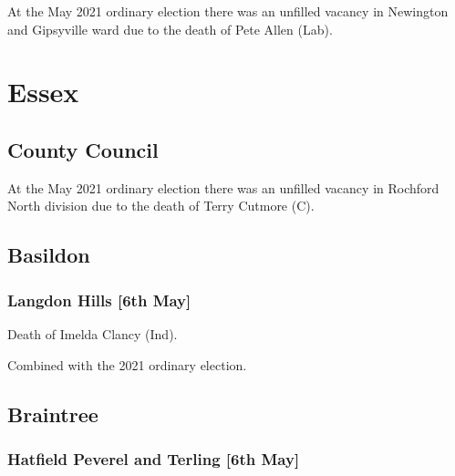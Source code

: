 \documentclass[a4paper,openany]{book}
\begin{document}
\begin{resultsiii}
At the May 2021 ordinary election there was an unfilled vacancy in Newington and Gipsyville ward due to the death of Pete Allen (Lab).

\section{Essex}

\subsection*{County Council}

At the May 2021 ordinary election there was an unfilled vacancy in Rochford North division due to the death of Terry Cutmore (C).

\subsection*{Basildon}

\subsubsection*{Langdon Hills \hspace*{\fill}\nolinebreak[1]%
	\enspace\hspace*{\fill}
	[6th May]}


Death of Imelda Clancy (Ind).

Combined with the 2021 ordinary election.

\subsection*{Braintree}

\subsubsection*{Hatfield Peverel and Terling \hspace*{\fill}\nolinebreak[1]%
	\enspace\hspace*{\fill}
	[6th May]}



\end{resultsiii}
\end{document}
